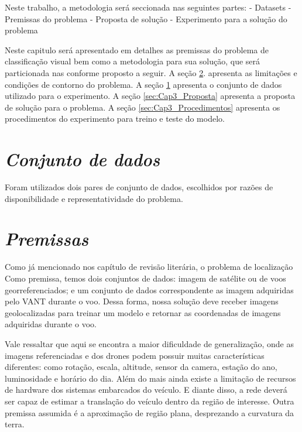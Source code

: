 Neste trabalho, a metodologia será seccionada nas seguintes partes:
    - Datasets
    - Premissas do problema
    - Proposta de solução
    - Experimento para a solução do problema

Neste capitulo será apresentado em detalhes as premissas do problema de classificação visual bem como a metodologia para sua solução, que será particionada nas conforme proposto a seguir. A seção \ref{sec:Cap3_Premissas}. apresenta as limitações e condições de contorno do problema. A seção \ref{sec:Cap3_Dataset} apresenta o conjunto de dados utilizado para o experimento. A seção \ref{sec:Cap3_Proposta} apresenta a proposta de solução para o problema. A seção \ref{sec:Cap3_Procedimentos} apresenta os procedimentos do experimento para treino e teste do modelo.


\section{\textit{Conjunto de dados}}\label{sec:Cap3_Dataset}
Foram utilizados dois pares de conjunto de dados, escolhidos por razões de disponibilidade e representatividade do problema. 




\section{\textit{Premissas}}\label{sec:Cap3_Premissas}
Como já mencionado nos capítulo de revisão literária, o problema de localização 
Como premissa, temos dois conjuntos de dados: imagem de satélite ou de voos georreferenciados; e um conjunto de dados correspondente as imagem adquiridas pelo VANT durante o voo. Dessa forma, nossa solução deve receber imagens geolocalizadas para treinar um modelo e retornar as coordenadas de imagens adquiridas durante o voo. 

Vale ressaltar que aqui se encontra a maior dificuldade de generalização, onde as imagens referenciadas e dos drones podem possuir muitas características diferentes: como rotação, escala, altitude, sensor da camera, estação do ano, luminosidade e horário do dia. Além do mais ainda existe a limitação de recursos de hardware dos sistemas embarcados do veículo. E diante disso, a rede deverá ser capaz de estimar a translação do veículo dentro da região de interesse. Outra premissa assumida é a aproximação de região plana, desprezando a curvatura da terra.

